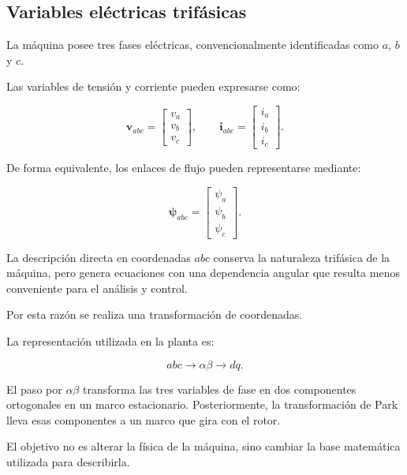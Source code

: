 \subsection{Variables eléctricas trifásicas}

La máquina posee tres fases eléctricas, convencionalmente identificadas como $a$, $b$ y $c$.

Las variables de tensión y corriente pueden expresarse como:

\begin{equation}
\mathbf{v}_{abc}
=
\begin{bmatrix}
v_a\\
v_b\\
v_c
\end{bmatrix},
\qquad
\mathbf{i}_{abc}
=
\begin{bmatrix}
i_a\\
i_b\\
i_c
\end{bmatrix}.
\end{equation}

De forma equivalente, los enlaces de flujo pueden representarse mediante:

\begin{equation}
\boldsymbol{\psi}_{abc}
=
\begin{bmatrix}
\psi_a\\
\psi_b\\
\psi_c
\end{bmatrix}.
\end{equation}

La descripción directa en coordenadas $abc$ conserva la naturaleza trifásica de la máquina, pero genera ecuaciones con una dependencia angular que resulta menos conveniente para el análisis y control.

Por esta razón se realiza una transformación de coordenadas.

La representación utilizada en la planta es:

\begin{equation}
abc
\rightarrow
\alpha\beta
\rightarrow
dq.
\end{equation}

El paso por $\alpha\beta$ transforma las tres variables de fase en dos componentes ortogonales en un marco estacionario. Posteriormente, la transformación de Park lleva esas componentes a un marco que gira con el rotor.

El objetivo no es alterar la física de la máquina, sino cambiar la base matemática utilizada para describirla.

